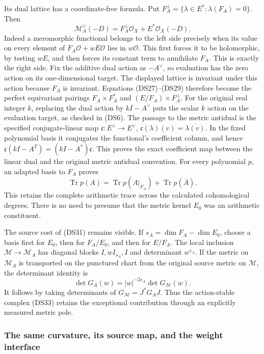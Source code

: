 Its dual lattice has a coordinate-free formula.  Put
$F_A^\perp=\{\lambda\in E^*: \lambda(F_A)=0\}$.  Then
\[
 \mathcal M_A^\vee(-D)=F_A^\perp\mathcal O_X+E^*\mathcal O_X(-D).
 \tag{DS34}
\]
Indeed a meromorphic functional belongs to the left side precisely
when its value on every element of $F_A\mathcal O+wE\mathcal O$
lies in $w\mathcal O$.  This first forces it to be holomorphic,
by testing $wE$, and then forces its constant term to annihilate
$F_A$.  This is exactly the right side.  Fix the additive dual
action as $-A^\vee$, so evaluation has the zero action on its
one-dimensional target.  The displayed lattice is invariant under
this action because $F_A$ is invariant.  Equations (DS27)--(DS29)
therefore become the perfect equivariant pairings
$F_A\times F_A^*$ and $(E/F_A)\times F_A^\perp$.
For the original real integer $k$, replacing the dual action by
$kI-A^\vee$ puts the scalar $k$ action on the evaluation target,
as checked in (DS6).  The passage to the metric antidual is the
specified conjugate-linear map
$\mathfrak c:E^\vee\to E^{\overline\vee}$,
$\mathfrak c(\lambda)(v)=\overline{\lambda(v)}$.
In the fixed polynomial basis it conjugates the functional's
coefficient column, and hence
$\mathfrak c(kI-A^T)=(kI-A^*)\mathfrak c$.
This proves the exact coefficient map between the linear dual and
the original metric antidual convention.
For every polynomial $p$, an adapted basis to $F_A$ proves
\[
 \operatorname{Tr}p(A)=
 \operatorname{Tr}p(A|_{F_A})+
 \operatorname{Tr}p(\overline A).
 \tag{DS35}
\]
This retains the complete arithmetic trace across the calculated
cohomological degrees.  There is no need to presume that the metric
kernel $E_0$ was an arithmetic constituent.

The source cost of (DS31) remains visible.  If
$s_A=\dim F_A-\dim E_0$, choose a basis first for $E_0$, then for
$F_A/E_0$, and then for $E/F_A$.  The local inclusion
$\mathcal M\to\mathcal M_A$ has diagonal blocks
$I,wI_{s_A},I$ and determinant $w^{s_A}$.  If the metric on
$\mathcal M_A$ is transported on the punctured chart from the
original source metric on $\mathcal M$, the determinant identity is
\[
 \det G_A(w)=|w|^{-2s_A}\det G_{\mathcal M}(w).
 \tag{DS36}
\]
It follows by taking determinants of $G_{\mathcal M}=J^*G_AJ$.
Thus the action-stable complex (DS33) retains the exceptional
contribution through an explicitly measured metric pole.

\subsubsection{The same curvature, its source map, and the weight interface}

